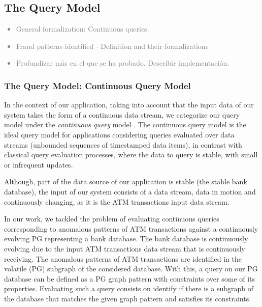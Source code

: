 \newpage
\subsection{The Query Model}\label{section:queryModel}

\textcolor{gray}{
\begin{itemize}
    \item General formalization: Continuous queries.
    \item Fraud patterns identified - Definition and their formalizations
    \item Profundizar más en el que se ha probado. Describir implementación.
\end{itemize}
}

\subsubsection*{The Query Model: Continuous Query Model}
In the context of our application, taking into account that the input data of our system takes the form of a continuous data stream, we categorize our query model under the \emph{continuous query} model \cite{CQ-babu2001continuous, CQ-zaniolo2012logical}. The continuous query model is the ideal query model for applications considering queries evaluated over data streams (unbounded sequences of timestamped data items), in contrast with classical query evaluation processes, where the data to query is stable, with small or infrequent updates. 

Although, part of the data source of our application is stable (the stable bank database), the input of our system consists of a data stream, data in motion and continuously changing, as it is the ATM transactions input data stream. 

In our work, we tackled the problem of evaluating continuous queries corresponding to anomalous patterns of ATM transactions against a continuously evolving PG representing a bank database. 
The bank database is continuously evolving due to the input ATM transactions data stream that is continuously receiving.
The anomalous patterns of ATM transactions are identified in the volatile (PG) subgraph of the considered database. With this, a query on our PG database can be defined as a PG graph pattern with constraints over some of its properties. Evaluating such a query consists on identify if there is a subgraph of the database that matches the given graph pattern and satisfies its constraints.

